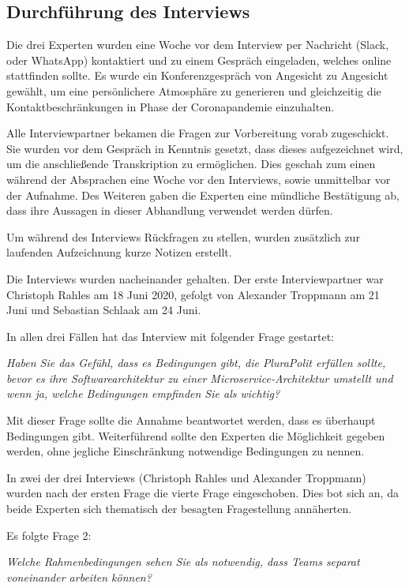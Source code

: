 \subsection{Durchführung des Interviews}

Die drei Experten wurden eine Woche vor dem Interview per Nachricht (Slack, oder WhatsApp) kontaktiert und zu einem Gespräch eingeladen, welches online stattfinden sollte. Es wurde ein Konferenzgespräch von Angesicht zu Angesicht gewählt, um eine persönlichere Atmosphäre zu generieren und gleichzeitig die Kontaktbeschränkungen in Phase der Coronapandemie einzuhalten.

Alle Interviewpartner bekamen die Fragen zur Vorbereitung vorab zugeschickt. Sie wurden vor dem Gespräch in Kenntnis gesetzt, dass dieses aufgezeichnet wird, um die anschließende Tran­skrip­ti­on zu ermöglichen. Dies geschah zum einen während der Absprachen eine Woche vor den Interviews, sowie unmittelbar vor der Aufnahme. Des Weiteren gaben die Experten eine mündliche Bestätigung ab, dass ihre Aussagen in dieser Abhandlung verwendet werden dürfen.

Um während des Interviews Rückfragen zu stellen, wurden zusätzlich zur laufenden Aufzeichnung kurze Notizen erstellt.

Die Interviews wurden nacheinander gehalten. Der erste Interviewpartner war Christoph Rahles am 18 Juni 2020, gefolgt von Alexander Troppmann am 21 Juni und Sebastian Schlaak am 24 Juni.

In allen drei Fällen hat das Interview mit folgender Frage gestartet:

\textit{Haben Sie das Gefühl, dass es Bedingungen gibt, die PluraPolit erfüllen sollte, bevor es ihre Softwarearchitektur zu einer Microservice-Architektur umstellt und wenn ja, welche Bedingungen empfinden Sie als wichtig?}

Mit dieser Frage sollte die Annahme beantwortet werden, dass es überhaupt Bedingungen gibt. Weiterführend sollte den Experten die Möglichkeit gegeben werden, ohne jegliche Einschränkung notwendige Bedingungen zu nennen.

In zwei der drei Interviews (Christoph Rahles und Alexander Troppmann) wurden nach der ersten Frage die vierte Frage eingeschoben. Dies bot sich an, da beide Experten sich thematisch der besagten Fragestellung annäherten.

Es folgte Frage 2:

\textit{Welche Rahmenbedingungen sehen Sie als notwendig, dass Teams separat voneinander arbeiten können?}

